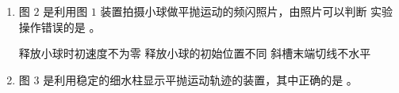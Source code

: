 \begin{enumerate}
\begin{enumerate}
\item 
图 $ 2 $ 是利用图 $ 1 $ 装置拍摄小球做平抛运动的频闪照片，由照片可以判断
实验操作错误的是  。
\begin{figure}[h!]
\centering

\end{figure}

\threechoices
{释放小球时初速度不为零}
{释放小球的初始位置不同}
{斜槽末端切线不水平}

\item 
图 $ 3 $ 是利用稳定的细水柱显示平抛运动轨迹的装置，其中正确的是  。
\begin{figure}[h!]
\centering

\end{figure}

\end{enumerate}







\end{enumerate}

